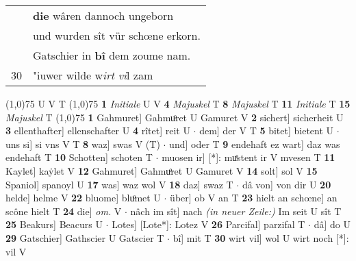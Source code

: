 \documentclass[8pt,a4paper,notitlepage]{article}
\begin{document}
\begin{table}[ht]
\begin{minipage}[t]{0.5\linewidth}
\begin{tabular}{rl}
 & \textbf{die} wâren dannoch ungeborn\\ 
 & und wurden sît vür schœne erkorn.\\ 
 & Gatschier in \textbf{bî} dem zoume nam.\\ 
30 & "iuwer wilde w\textit{irt vi}l zam\\ 
\end{tabular}
\scriptsize
\line(1,0){75} \newline
U V T \newline
\line(1,0){75} \newline
\textbf{1} \textit{Initiale} U V  \textbf{4} \textit{Majuskel} T  \textbf{8} \textit{Majuskel} T  \textbf{11} \textit{Initiale} T  \textbf{15} \textit{Majuskel} T  \newline
\line(1,0){75} \newline
\textbf{1} Gahmuret] Gahmuͦret U Gamuret V \textbf{2} sichert] sicherheit U \textbf{3} ellenthafter] ellenschafter U \textbf{4} rîtet] reit U  $\cdot$ dem] der V T \textbf{5} bitet] bietent U  $\cdot$ uns si] si vns V T \textbf{8} waz] swas V (T)  $\cdot$ und] oder T \textbf{9} endehaft ez wart] daz was endehaft T \textbf{10} Schotten] schoten T  $\cdot$ muosen ir] [*]: muͤstent ir V mvesen T \textbf{11} Kaylet] kaẏlet V \textbf{12} Gahmuret] Gahmuͦret U Gamuret V \textbf{14} solt] sol V \textbf{15} Spaniol] spanoyl U \textbf{17} was] waz wol V \textbf{18} daz] swaz T  $\cdot$ dâ von] von dir U \textbf{20} helde] helme V \textbf{22} bluome] bluͦmet U  $\cdot$ über] ob V an T \textbf{23} hielt an schœne] an scône hielt T \textbf{24} die] \textit{om.} V  $\cdot$ nâch im sît] nach \textit{(in neuer Zeile:)} Im seit U sît T \textbf{25} Beakurs] Beacurs U  $\cdot$ Lotes] [Lote*]: Lotez V \textbf{26} Parcifal] parzifal T  $\cdot$ dâ] do U \textbf{29} Gatschier] Gathscier U Gatscier T  $\cdot$ bî] mit T \textbf{30} wirt vil] wol U wirt noch [*]: vil V \newline
\end{minipage}
\end{table}
\end{document}
